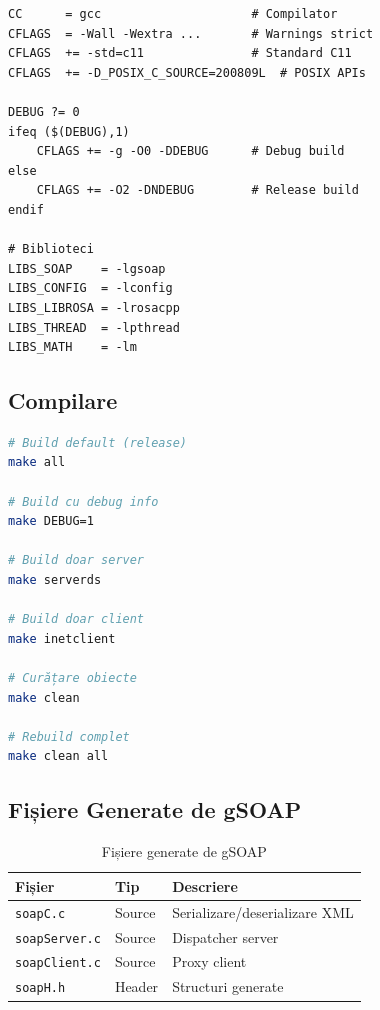 \documentclass[12pt,a4paper,oneside]{book}
\begin{document}
\begin{lstlisting}[caption=Variabile de compilare]
CC      = gcc                     # Compilator
CFLAGS  = -Wall -Wextra ...       # Warnings strict
CFLAGS  += -std=c11               # Standard C11
CFLAGS  += -D_POSIX_C_SOURCE=200809L  # POSIX APIs

DEBUG ?= 0
ifeq ($(DEBUG),1)
    CFLAGS += -g -O0 -DDEBUG      # Debug build
else
    CFLAGS += -O2 -DNDEBUG        # Release build
endif

# Biblioteci
LIBS_SOAP    = -lgsoap
LIBS_CONFIG  = -lconfig
LIBS_LIBROSA = -lrosacpp
LIBS_THREAD  = -lpthread
LIBS_MATH    = -lm
\end{lstlisting}

\subsection{Compilare}

\begin{lstlisting}[language=bash,caption=Comenzi de compilare]
# Build default (release)
make all

# Build cu debug info
make DEBUG=1

# Build doar server
make serverds

# Build doar client
make inetclient

# Curățare obiecte
make clean

# Rebuild complet
make clean all
\end{lstlisting}

\subsection{Fișiere Generate de gSOAP}

\begin{table}[H]
\centering
\begin{tabularx}{\textwidth}{|l|l|X|}
\hline
\textbf{Fișier} & \textbf{Tip} & \textbf{Descriere} \\
\hline
\texttt{soapC.c} & Source & Serializare/deserializare XML \\
\hline
\texttt{soapServer.c} & Source & Dispatcher server \\
\hline
\texttt{soapClient.c} & Source & Proxy client \\
\hline
\texttt{soapH.h} & Header & Structuri generate \\
\hline
\end{tabularx}
\caption{Fișiere generate de gSOAP}
\end{table}
\end{document}
